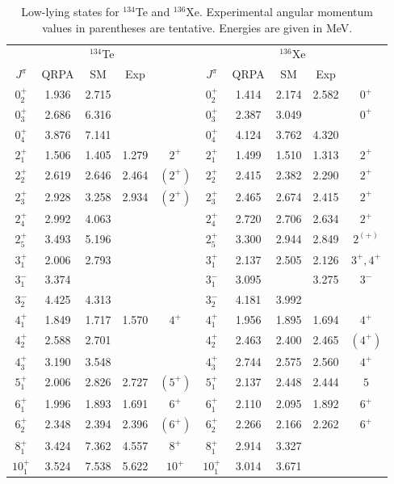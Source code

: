 \begin{table}[htbp]
\begin{center}
\caption{Low-lying states for $^{134}$Te and $^{136}$Xe. Experimental 
angular
momentum values in parentheses are tentative. Energies are given in MeV.}
\begin{tabular}{ccccc|ccccc}
\hline
\multicolumn{5}{c|}{$^{134}$Te} & \multicolumn{5}{c}{$^{136}$Xe} \\
$J^{\pi}$ & QRPA & SM & Exp & & $J^{\pi}$ &  
QRPA & SM & Exp & \\ 
\hline
$0^{+}_{2}$ & 1.936 & 2.715 &  & & 
$0^{+}_{2}$ & 1.414 & 2.174 & 2.582 &$0^{+}$ \\
$0^{+}_{3}$ & 2.686 & 6.316 & & & 
$0^{+}_{3}$ & 2.387 & 3.049 &  & $0^{+}$ \\
$0^{+}_{4}$ & 3.876 & 7.141 &  & & 
$0^{+}_{4}$ & 4.124 & 3.762 & 4.320& \\
$2^{+}_{1}$ & 1.506 & 1.405 & 1.279 & 
$2^{+}$ &$2^{+}_{1}$ & 1.499 & 1.510 & 1.313 & $2^{+}$ \\
$2^{+}_{2}$ & 2.619 & 2.646 & 2.464 & $(2^{+})$ &
$2^{+}_{2}$ & 2.415 & 2.382 & 2.290 & $2^{+}$ \\
$2^{+}_{3}$ & 2.928 & 3.258 & 2.934 & $(2^{+})$ &
$2^{+}_{3}$ & 2.465 & 2.674 & 2.415 & $2^{+}$ \\
$2^{+}_{4}$ & 2.992 & 4.063 & & &
$2^{+}_{4}$ & 2.720 & 2.706 & 2.634 & $2^{+}$ \\
$2^{+}_{5}$ & 3.493 & 5.196 &  & &
$2^{+}_{5}$ & 3.300 & 2.944 & 2.849 & $2^{(+)}$ \\
$3^{+}_{1}$ & 2.006 & 2.793 & & &
$3^{+}_{1}$ & 2.137 & 2.505 & 2.126 & $3^{+},4^{+}$ \\ 
$3^{-}_{1}$ & 3.374 &       & & &
$3^{-}_{1}$ & 3.095 &       & 3.275 & $3^{-}$ \\ 
$3^{-}_{2}$ & 4.425 & 4.313 & & &
$3^{-}_{2}$ & 4.181 & 3.992 & & \\
$4^{+}_{1}$ & 1.849 & 1.717 & 1.570 & $4^{+}$ & 
$4^{+}_{1}$ & 1.956 & 1.895 & 1.694 & $4^{+}$ \\
$4^{+}_{2}$ & 2.588 & 2.701 & & & 
$4^{+}_{2}$ & 2.463 & 2.400 & 2.465 & $(4^{+})$ \\
$4^{+}_{3}$ & 3.190 & 3.548 & & &
$4^{+}_{3}$ & 2.744 & 2.575 & 2.560 & $4^{+}$ \\
$5^{+}_{1}$ & 2.006 & 2.826 & 2.727 & $(5^{+})$ &
$5^{+}_{1}$ & 2.137 & 2.448 & 2.444 & $5$ \\ 
$6^{+}_{1}$ & 1.996 & 1.893 & 1.691 & $6^{+}$ &
$6^{+}_{1}$ & 2.110 & 2.095 & 1.892 & $6^{+}$ \\  
$6^{+}_{2}$ & 2.348 & 2.394 & 2.396 & $(6^{+})$ &
$6^{+}_{2}$ & 2.266 & 2.166 & 2.262 & $6^{+}$ \\
$8^{+}_{1}$ & 3.424 & 7.362 & 4.557 & $8^{+}$ &
$8^{+}_{1}$ & 2.914 & 3.327 &  & \\
$10^{+}_{1}$ &3.524 & 7.538 & 5.622 & $10^{+}$ &
$10^{+}_{1}$ &3.014 & 3.671 & & \\
\hline
\end{tabular}
\label{tab:even-1}
\end{center}
\end{table}


